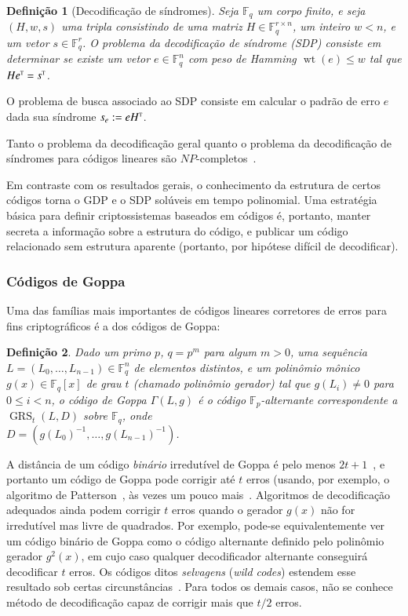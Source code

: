 \documentclass{SBCbookchapter}
\newcommand{\F}{\mathbb{F}}
\newcommand{\tp}{\textrm{\tiny T}}
\DeclareMathOperator{\wt}{wt}
\DeclareMathOperator{\GRS}{GRS}
\newtheorem{definition}{Definição}{\bfseries}{\itshape}
\begin{document}
\begin{otherlanguage}{brazilian}
\begin{definition}[Decodificação de síndromes]\label{def:sdp}
Seja $\F_q$ um corpo finito, e seja $(H, w, s)$ uma tripla consistindo de uma matriz $H \in \F_q^{r \times n}$, um inteiro $w < n$, e um vetor $s \in \F_q^{r}$. O \emph{problema da decodificação de síndrome (SDP)} consiste em determinar se existe um vetor $e \in \F_q^{n}$ com peso de Hamming $\wt(e) \leqslant w$ tal que $H e^{\tp} = s^{\tp}$.
\end{definition}
O problema de busca associado ao SDP consiste em calcular o padrão de erro $e$ dada sua síndrome $s_e := e H^{\tp}$.

Tanto o problema da decodificação geral quanto o problema da decodificação de síndromes para códigos lineares são $NP$-completos~\cite{berlekamp-mceliece-vantilborg}.

Em contraste com os resultados gerais, o conhecimento da estrutura de certos códigos torna o GDP e o SDP solúveis em tempo polinomial.
Uma estratégia básica para definir criptossistemas baseados em códigos é, portanto, manter secreta a informação sobre a estrutura do código, e publicar um código relacionado sem estrutura aparente (portanto, por hipótese difícil de decodificar).

\subsubsection{Códigos de Goppa}\label{subsubsec:goppa}

Uma das famílias mais importantes de códigos lineares corretores de erros para fins criptográficos é a dos códigos de Goppa:
\begin{definition}\label{def:goppa}
Dado um primo $p$, $q = p^m$ para algum $m > 0$, uma sequência \\$L = (L_0, \dots, L_{n-1}) \in \F_q^n$ de elementos distintos, e um polinômio mônico $g(x) \in \F_q[x]$ de grau $t$ (chamado polinômio gerador) tal que $g(L_i) \neq 0$ para $0 \leqslant i < n$, o \emph{código de Goppa} $\Gamma(L, g)$ é o código $\F_p$-alternante correspondente a $\GRS_t(L, D)$ sobre $\F_q$, onde \\$D = (g(L_0)^{-1}, \dots, g(L_{n-1})^{-1})$.
\end{definition}

A distância de um código \emph{binário} irredutível de Goppa é pelo menos $2t + 1$~\cite{goppa}, e portanto um código de Goppa pode corrigir até $t$ erros (usando, por exemplo, o algoritmo de Patterson~\cite{patterson}, às vezes um pouco mais~\cite{bernstein}. Algoritmos de decodificação adequados ainda podem corrigir $t$ erros quando o gerador $g(x)$ não for irredutível mas livre de quadrados. Por exemplo, pode-se equivalentemente ver um código binário de Goppa como o código alternante definido pelo polinômio gerador $g^2(x)$, em cujo caso qualquer decodificador alternante conseguirá decodificar $t$ erros. Os códigos ditos \emph{selvagens} (\emph{wild codes}) estendem esse resultado sob certas circunstâncias~\cite{bernstein-lange-peters:wild}. Para todos os demais casos, não se conhece método de decodificação capaz de corrigir mais que $t/2$ erros.


\end{otherlanguage}
\end{document}
